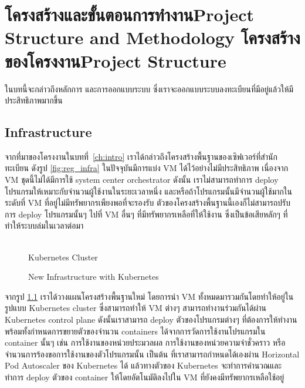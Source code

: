\chapter{\ifproject%
\ifcpe โครงสร้างและขั้นตอนการทำงาน\else Project Structure and Methodology\fi
\else%
\ifcpe โครงสร้างของโครงงาน\else Project Structure\fi
\fi
}
\label{ch:approach}

ในบทนี้จะกล่าวถึงหลักการ และการออกแบบระบบ ซึ่งเราจะออกแบบระบบลงทะเบียนที่มีอยู่แล้วให้มีประสิทธิภาพมากขึ้น

\makeatletter

\section {Infrastructure}
\label{sec:infra}

จากที่มาของโครงงานในบทที่~\ref{ch:intro} เราได้กล่าวถึงโครงสร้างพื้นฐานของเซิฟเวอร์ที่สำนักทะเบียน ดังรูป \ref{fig:reg_infra} ในปัจจุบันมีการแบ่ง VM \cite{vm} ได้ไว้อย่างไม่มีประสิทธิภาพ เนื่องจาก VM ชุดนี้ไม่ได้มีการใช้ system center orchestrator \cite{sco} ดังนั้น เราไม่สามารถทำการ deploy โปรแกรมให้เหมาะกับจำนวนผู้ใช้งานในระยะเวลาหนึ่ง และหรือถ้าโปรแกรมนั้นมีจำนวนผู้ใช้มากในระดับที่ VM ที่อยู่ไม่มีทรัพยากรเพืยงพอที่จะรองรับ ตัวของโครงสร้างพื้นฐานนี้เองก็ไม่สามารถปรับการ deploy โปรแกรมนั้นๆ ไปที่ VM อื่นๆ ที่มีทรัพยากรเหลือที่ให้ใช้งาน ซึ่งเป็นข้อเสียหลักๆ ที่ทำให้ระบบล่มในเวลาต่อมา

\begin{figure}
    \centering
    \begin{center}
     \\
    Kubernetes Cluster
    \end{center}
    \caption[Poem]{New Infrastructure with Kubernetes}
    \label{fig:new_infra}
\end{figure}

จากรูป \ref{fig:new_infra} เราได้วางแผนโครงสร้างพื้นฐานใหม่ โดยการนำ VM ทั้งหมดมารวมกันโดยทำให้อยู่ในรูปแบบ Kubernetes cluster ซึ่งสามารถทำให้ VM ต่างๆ สามารถทำงานร่วมกันได้ผ่าน Kubernetes control plane \cite{kubecomp} ดังนั้นเราสามารถ deploy ตัวของโปรแกรมต่างๆ ที่ต้องการให้ทำงาน พร้อมทั้งกำหนดการขยายตัวของจำนวน containers ได้จากการวัดการใช้งานโปรแกรมใน container นั้นๆ เช่น การใช้งานของหน่วยประมวลผล การใช้งานของหน่วยความจำชั่วคราว หรือจำนวนการร้องขอการใช้งานของตัวโปรแกรมนั้น เป็นต้น ที่เราสามารถกำหนดได้เองผ่าน Horizontal Pod Autoscaler \cite{kubehpa} ของ Kubernetes ได้ แล้วทางตัวของ Kubernetes จะทำการคำนวณและทำการ deploy ตัวของ container ให้โดยอัตโนมัติลงไปใน VM ที่ยังคงมีทรัพยากรเหลือใช้อยู่


